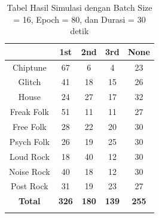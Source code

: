 \begin{longtable}[c]{|c|c|c|c|c|}
	\hline
	\textbf{}      & \textbf{1st} & \textbf{2nd} & \textbf{3rd} & \textbf{None} \\ \hline
	\endfirsthead
	\endhead
	Chiptune       & 67           & 6            & 4            & 23            \\ \hline
	Glitch         & 41           & 18           & 15           & 26            \\ \hline
	House          & 24           & 27           & 17           & 32            \\ \hline
	Freak Folk     & 51           & 11           & 11           & 27            \\ \hline
	Free Folk      & 28           & 22           & 20           & 30            \\ \hline
	Psych Folk     & 26           & 19           & 25           & 30            \\ \hline
	Loud Rock      & 18           & 40           & 12           & 30            \\ \hline
	Noise Rock     & 40           & 18           & 12           & 30            \\ \hline
	Post Rock      & 31           & 19           & 23           & 27            \\ \hline
	\textbf{Total} & \textbf{326} & \textbf{180} & \textbf{139} & \textbf{255}  \\ \hline
	\caption{Tabel Hasil Simulasi dengan Batch Size = 16, Epoch = 80, dan Durasi = 30 detik}
	\label{tab:my-table}\\
\end{longtable}

